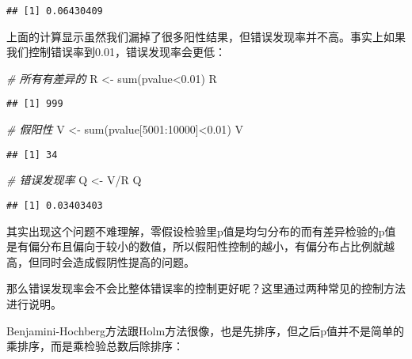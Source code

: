 \documentclass[]{tufte-book}
\newenvironment{Shaded}{}{}
\newcommand{\CommentTok}[1]{\textcolor[rgb]{0.38,0.63,0.69}{\textit{#1}}}
\newcommand{\DecValTok}[1]{\textcolor[rgb]{0.25,0.63,0.44}{#1}}
\newcommand{\FloatTok}[1]{\textcolor[rgb]{0.25,0.63,0.44}{#1}}
\newcommand{\FunctionTok}[1]{\textcolor[rgb]{0.02,0.16,0.49}{#1}}
\newcommand{\NormalTok}[1]{#1}
\newcommand{\OtherTok}[1]{\textcolor[rgb]{0.00,0.44,0.13}{#1}}
\newcommand{\SpecialCharTok}[1]{\textcolor[rgb]{0.25,0.44,0.63}{#1}}
\begin{document}
\begin{verbatim}
## [1] 0.06430409
\end{verbatim}

上面的计算显示虽然我们漏掉了很多阳性结果，但错误发现率并不高。事实上如果我们控制错误率到0.01，错误发现率会更低：

\begin{Shaded}
\begin{Highlighting}[]
\CommentTok{\# 所有有差异的}
\NormalTok{R }\OtherTok{\textless{}{-}} \FunctionTok{sum}\NormalTok{(pvalue}\SpecialCharTok{\textless{}}\FloatTok{0.01}\NormalTok{)}
\NormalTok{R}
\end{Highlighting}
\end{Shaded}

\begin{verbatim}
## [1] 999
\end{verbatim}

\begin{Shaded}
\begin{Highlighting}[]
\CommentTok{\# 假阳性}
\NormalTok{V }\OtherTok{\textless{}{-}} \FunctionTok{sum}\NormalTok{(pvalue[}\DecValTok{5001}\SpecialCharTok{:}\DecValTok{10000}\NormalTok{]}\SpecialCharTok{\textless{}}\FloatTok{0.01}\NormalTok{)}
\NormalTok{V}
\end{Highlighting}
\end{Shaded}

\begin{verbatim}
## [1] 34
\end{verbatim}

\begin{Shaded}
\begin{Highlighting}[]
\CommentTok{\# 错误发现率}
\NormalTok{Q }\OtherTok{\textless{}{-}}\NormalTok{ V}\SpecialCharTok{/}\NormalTok{R}
\NormalTok{Q}
\end{Highlighting}
\end{Shaded}

\begin{verbatim}
## [1] 0.03403403
\end{verbatim}

其实出现这个问题不难理解，零假设检验里p值是均匀分布的而有差异检验的p值是有偏分布且偏向于较小的数值，所以假阳性控制的越小，有偏分布占比例就越高，但同时会造成假阴性提高的问题。

那么错误发现率会不会比整体错误率的控制更好呢？这里通过两种常见的控制方法进行说明。

Benjamini-Hochberg方法跟Holm方法很像，也是先排序，但之后p值并不是简单的乘排序，而是乘检验总数后除排序：
\end{document}
